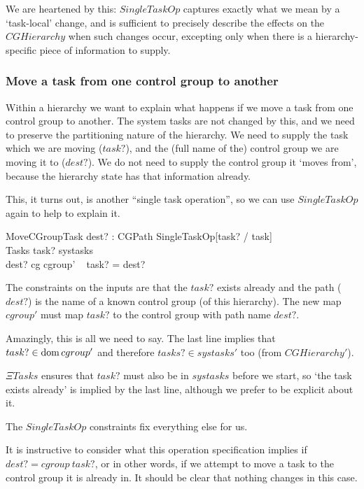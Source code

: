 \documentclass[a4paper,twoside,12pt]{article}
\begin{document}
We are heartened by this: $SingleTaskOp$ captures exactly what we mean by a `task-local' change,
and is sufficient to precisely describe the effects on the $CGHierarchy$ when such changes occur, excepting only
when there is
a hierarchy-specific piece of information to supply.

\subsubsection{Move a task from one control group to another}

Within a hierarchy we want to explain what happens if we move a task from one control group to another.
The system tasks are not changed by this, and we need to preserve the partitioning nature of the hierarchy.
We need to supply the task which we are moving ($task?$),
and the (full name of the) control group we are moving it to ($dest?$).
We do not need to supply the control group it `moves from', because the hierarchy state has that information already.

This, it turns out, is another ``single task operation'', so we can use $SingleTaskOp$ again to help to explain it.

\begin{schema}{MoveCGroupTask}
dest? : CGPath
\also
SingleTaskOp[task? / task] \\
\Xi Tasks
\where
task? \in systasks \\
dest? \in \dom cg
\also
cgroup' ~ task?  = dest?
\end{schema}
The constraints on the inputs are that the $task?$ exists already and
the path ($dest?$) is the name of a known control group (of this hierarchy).
The new map $cgroup'$ must map $task?$ to the control group with path name $dest?$.

Amazingly, this is all we need to say. The last line implies that $task? \in \mathop{\mathrm{dom}} cgroup'$ and therefore
$tasks? \in systasks'$ too (from $CGHierarchy'$).

$\Xi Tasks$ ensures that $task?$ must also be in $systasks$ before we start, so `the task exists already' is implied by the last line, although we prefer to be explicit about it.

The $SingleTaskOp$ constraints fix everything else for us.

It is instructive to consider what this operation specification implies if $dest? = cgroup ~ task?$, or in other words, if we
attempt to move a task to the control group it is already in. It should be clear that nothing changes in this case.
\end{document}
